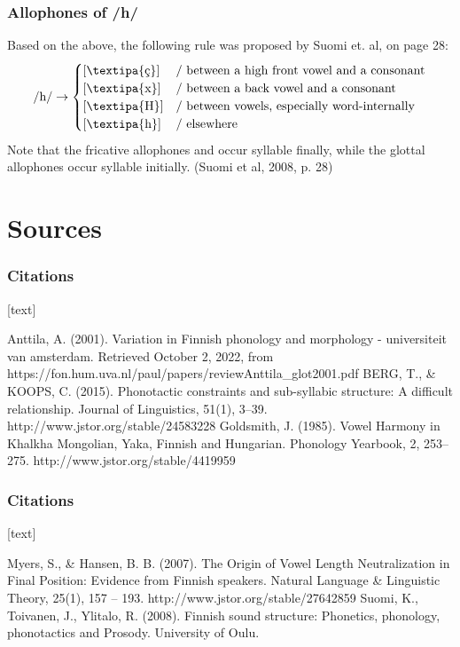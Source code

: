 \documentclass{beamer}
\begin{document}
\begin{frame}
	\frametitle{Allophones of /h/}
	Based on the above, the following rule was proposed by Suomi et. al, on page 28:
	\[
		/\text{h}/ \rightarrow
		\begin{cases}
			[\text{\textipa{\c{c}}}] & / \text{ between a high front vowel and a consonant}\\
			[\text{\textipa{x}}] & / \text{ between a back vowel and a consonant}\\
			[\text{\textipa{H}}] & / \text{ between vowels, especially word-internally}\\
			[\text{\textipa{h}}] & / \text{ elsewhere}\\
		\end{cases}
	\]
	Note that the fricative allophones \textipa{[\c{c}]} and \textipa{[x]} occur syllable finally, while the glottal allophones occur syllable initially. (Suomi et al, 2008, p. 28)
\end{frame}


\section{Sources}

\begin{frame}
	\frametitle{Citations}
	[text]
	\begin{thebibliography}{10}
		 Anttila, A. (2001). Variation in Finnish phonology and morphology - universiteit van amsterdam. Retrieved October 2, 2022, from https://fon.hum.uva.nl/paul/papers/reviewAnttila\_glot2001.pdf 
		 BERG, T., \& KOOPS, C. (2015). Phonotactic constraints and sub-syllabic structure: A difficult relationship. Journal of Linguistics, 51(1), 3--39. http://www.jstor.org/stable/24583228
		 Goldsmith, J. (1985). Vowel Harmony in Khalkha Mongolian, Yaka, Finnish and Hungarian. Phonology Yearbook, 2, 253--275. http://www.jstor.org/stable/4419959
	\end{thebibliography}
\end{frame}

\begin{frame}
	\frametitle{Citations}
	[text]
	\begin{thebibliography}{10}
		 Myers, S., \& Hansen, B. B. (2007). The Origin of Vowel Length Neutralization in Final Position: Evidence from Finnish speakers. Natural Language \& Linguistic Theory, 25(1), 157 -- 193. http://www.jstor.org/stable/27642859
		 Suomi, K., Toivanen, J., Ylitalo, R. (2008). Finnish sound structure: Phonetics, phonology, phonotactics and Prosody. University of Oulu. 
	\end{thebibliography}
\end{frame}
\end{document}
